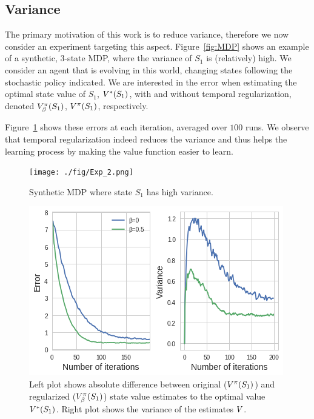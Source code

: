 \subsection{Variance}
\label{sec:expe:variance}
The primary motivation of this work is to reduce variance, therefore we now consider an experiment  targeting this aspect. Figure~\ref{fig:MDP} shows an example of a synthetic, 3-state MDP, where the variance of $S_1$ is (relatively) high. We consider an agent that is evolving in this world, changing states following the stochastic policy indicated. We are interested in the error when estimating the optimal state value of $S_1$, $V^*(S_1)$, with and without temporal regularization, denoted $V_{\beta}^{\pi}(S_1)$, $V^{\pi}(S_1)$, respectively.

Figure~\ref{fig:perf_MDP} shows these errors at each iteration, averaged over $100$ runs. We observe that temporal regularization indeed reduces the variance and thus helps the learning process by making the value function easier to learn.


\begin{figure}
\begin{minipage}[c]{0.45\linewidth}
\texttt{[image: ./fig/Exp\_2.png]}
\caption{Synthetic MDP where state $S_1$ has high variance.}
\label{fig:MDP}
\end{minipage}
\hfill
\begin{minipage}[c]{0.45\linewidth}
\includegraphics[width=\linewidth]{./fig/Exp_2_result.png}
\caption{Left plot shows absolute difference between original ($V^{\pi}(S_1)$) and regularized ($V_{\beta}^{\pi}(S_1)$) state value estimates to the optimal value $V^*(S_1)$. Right plot shows the variance of the estimates $V$.}
\label{fig:perf_MDP}
\end{minipage}%
\end{figure}

